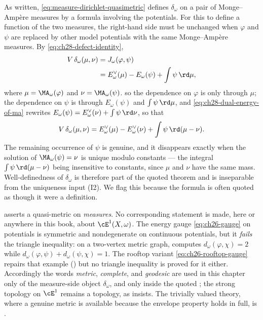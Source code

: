 \begin{remark}
\label{rem:ch28-quasimetric-well-defined}
As written, \eqref{eq:measure-dirichlet-quasimetric} defines
$\delta_\omega$ on a pair of Monge--Amp\`ere measures by a formula
involving the potentials.  For this to define a function of the two
measures, the right-hand side must be unchanged when $\varphi$ and
$\psi$ are replaced by other model potentials with the same
Monge--Amp\`ere measures.  By \eqref{eq:ch28-defect-identity},
\[
 \begin{aligned}
 V\,\delta_\omega(\mu,\nu)
 &=J_\omega(\varphi,\psi)\\
 &=E^\vee_\omega(\mu)-E_\omega(\psi)+\int\psi\,\rd\mu,
 \end{aligned}
\]
where $\mu=\MA_\omega(\varphi)$ and $\nu=\MA_\omega(\psi)$.
so the dependence on $\varphi$ is only through $\mu$; the dependence on
$\psi$ is through $E_\omega(\psi)$ and $\int\psi\,\rd\mu$, and
\eqref{eq:ch28-dual-energy-of-ma} rewrites
$E_\omega(\psi)=E^\vee_\omega(\nu)+\int\psi\,\rd\nu$, so that
\[
 V\,\delta_\omega(\mu,\nu)
 =E^\vee_\omega(\mu)-E^\vee_\omega(\nu)
   +\int\psi\,\rd(\mu-\nu).
\]
The remaining occurrence of $\psi$ is genuine, and it disappears exactly
when the solution of $\MA_\omega(\psi)=\nu$ is unique modulo constants ---
the integral $\int\psi\,\rd(\mu-\nu)$ being insensitive to constants,
since $\mu$ and $\nu$ have the same mass.  Well-definedness of
$\delta_\omega$ is therefore part of the quoted theorem and is
inseparable from the uniqueness input \textup{(I2)}.  We flag this because
the formula is often quoted as though it were a definition.
\end{remark}

\begin{remark}
\label{rem:ch28-not-a-metric-on-potentials}
 asserts a quasi-metric on
\emph{measures}.  No corresponding statement is made, here or anywhere in
this book, about $\cE^1(X,\omega)$.  The energy gauge
\eqref{eq:ch26-gauge} on potentials is symmetric and nondegenerate on
continuous potentials, but it \emph{fails} the triangle inequality: on a
two-vertex metric graph,  computes
$d_\omega(\varphi,\chi)=2$ while
$d_\omega(\varphi,\psi)+d_\omega(\psi,\chi)=1$.  The rooftop variant
\eqref{eq:ch26-rooftop-gauge} repairs that example
() but no triangle inequality is proved for it
either.  Accordingly the words \emph{metric}, \emph{complete}, and
\emph{geodesic} are used in this chapter only of the measure-side object
$\delta_\omega$, and only inside the quoted
; the strong topology on
$\cE^1$ remains a topology, as  insists.  The
trivially valued theory, where a genuine metric is available because the
envelope property holds in full, is .
\end{remark}

